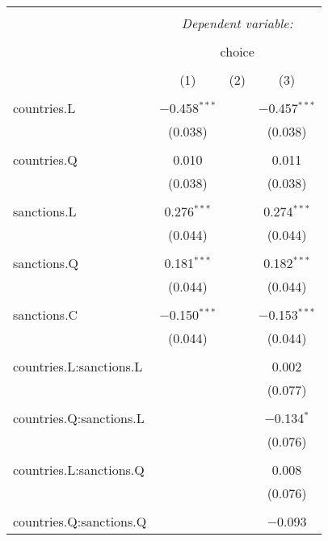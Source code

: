 
\begin{table}[!htbp] \centering 
  \caption{} 
  \label{tab:glm:int} 
\begin{tabular}{@{\extracolsep{5pt}}lccc} 
\\[-1.8ex]\hline 
\hline \\[-1.8ex] 
 & \multicolumn{3}{c}{\textit{Dependent variable:}} \\ 
\cline{2-4} 
\\[-1.8ex] & \multicolumn{3}{c}{choice} \\ 
\\[-1.8ex] & (1) & (2) & (3)\\ 
\hline \\[-1.8ex] 
 countries.L & $-$0.458$^{***}$ &  & $-$0.457$^{***}$ \\ 
  & (0.038) &  & (0.038) \\ 
  & & & \\ 
 countries.Q & 0.010 &  & 0.011 \\ 
  & (0.038) &  & (0.038) \\ 
  & & & \\ 
 sanctions.L & 0.276$^{***}$ &  & 0.274$^{***}$ \\ 
  & (0.044) &  & (0.044) \\ 
  & & & \\ 
 sanctions.Q & 0.181$^{***}$ &  & 0.182$^{***}$ \\ 
  & (0.044) &  & (0.044) \\ 
  & & & \\ 
 sanctions.C & $-$0.150$^{***}$ &  & $-$0.153$^{***}$ \\ 
  & (0.044) &  & (0.044) \\ 
  & & & \\ 
 countries.L:sanctions.L &  &  & 0.002 \\ 
  &  &  & (0.077) \\ 
  & & & \\ 
 countries.Q:sanctions.L &  &  & $-$0.134$^{*}$ \\ 
  &  &  & (0.076) \\ 
  & & & \\ 
 countries.L:sanctions.Q &  &  & 0.008 \\ 
  &  &  & (0.076) \\ 
  & & & \\ 
 countries.Q:sanctions.Q &  &  & $-$0.093 \\ 

\end{tabular}
\end{table}
